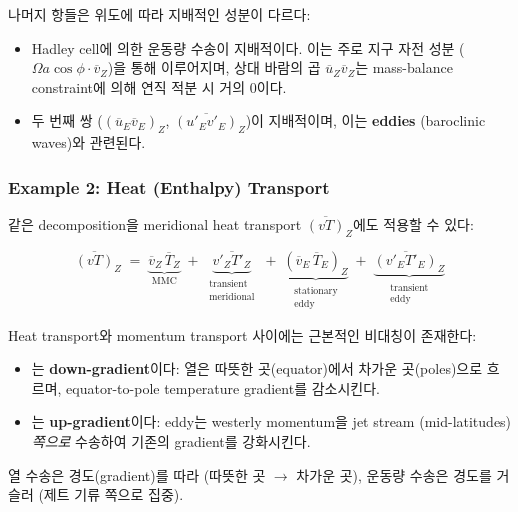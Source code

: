 \begin{remark}

  나머지 항들은 위도에 따라 지배적인 성분이 다르다:
  \begin{itemize}
    \item {} Hadley cell에 의한 운동량 수송이 지배적이다.
    이는 주로 지구 자전 성분 ($\Omega a\cos\phi \cdot \overline{v}_Z$)을 통해 이루어지며,
    상대 바람의 곱 $\overline{u}_Z\overline{v}_Z$는 mass-balance constraint에 의해 연직 적분 시 거의 0이다.
    \item {} 두 번째 쌍
    ($(\overline{u}_E\overline{v}_E)_Z$, $\overline{(u'_E v'_E)}_Z$)이 지배적이며,
    이는 \textbf{eddies} (baroclinic waves)와 관련된다.
  \end{itemize}
\end{remark}

\subsubsection{Example 2: Heat (Enthalpy) Transport}

같은 decomposition을 meridional heat transport $\overline{(vT)}_Z$에도 적용할 수 있다:

\begin{equation}\label{eq:vt-decomp}
  \overline{(vT)}_Z
  \;=\; \underbrace{\overline{v}_Z\,\overline{T}_Z}_{\text{MMC}}
  \;+\; \underbrace{\overline{v'_Z T'_Z}}_{\substack{\text{transient}\\\text{meridional}}}
  \;+\; \underbrace{(\overline{v}_E\,\overline{T}_E)_Z}_{\substack{\text{stationary}\\\text{eddy}}}
  \;+\; \underbrace{\overline{(v'_E T'_E)}_Z}_{\substack{\text{transient}\\\text{eddy}}}
\end{equation}

\begin{remark}

  Heat transport와 momentum transport 사이에는 근본적인 비대칭이 존재한다:
  \begin{itemize}
    \item {}는 \textbf{down-gradient}이다:
    열은 따뜻한 곳(equator)에서 차가운 곳(poles)으로 흐르며,
    equator-to-pole temperature gradient를 감소시킨다.
    \item {}는 \textbf{up-gradient}이다:
    eddy는 westerly momentum을 jet stream (mid-latitudes) \emph{쪽으로}
    수송하여 기존의 gradient를 강화시킨다.
  \end{itemize}
  \begin{hisublock}
    열 수송은 경도(gradient)를 따라 (따뜻한 곳 $\to$ 차가운 곳),
    운동량 수송은 경도를 거슬러 (제트 기류 쪽으로 집중).
  \end{hisublock}
\end{remark}

